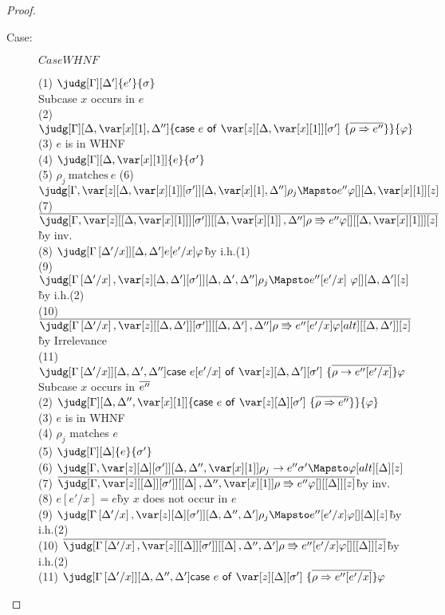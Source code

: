 \begin{proof}
\begin{description}
\item[Case:] $CaseWHNF$
\begin{tabbing}
    (1) $\judg[\G][\D']{e'}{\s}$\\
    Subcase $x$ occurs in $e$\\
    (2) $\judg[\G][\D,\xl,\D'']{\ccase{e}{\z[\D,\xl][\s']~\{\ov{\rho\Rightarrow e''}\}}}{\vp}$\\
    (3) $e$ is in WHNF\\
    (4) $\judg[\G][\D,\xl]{e}{\s'}$\\
    (5) $\rho_j~\textrm{matches}~e$
    (6) $\judg[\G,\zr{\D,\xl}{\s'}][\D,\xl,\D'']{\rho_j \Mapsto  e''}{\vp}[][\D,\xl][z]$\\
    (7) $\ov{\judg[\G,\zr{\irr{\D,\xl}}{\s'}][\irr{\D,\xl},\D'']{\rho\Rrightarrow e''}{\vp}[][\irr{\D,\xl}][z]}$\`by inv.\\
    (8) $\judg[\subst{\G}{\D'}{x}][\D,\D']{e[e'/x]}{\vp}$\`by i.h.(1)\\
    (9) $\judg[\subst{\G}{\D'}{x},\zr{\D,\D'}{\s'}][\D,\D',\D'']{\rho_j \Mapsto e''[e'/x]}{\ \vp}[][\D,\D'][z]$\` by i.h.(2)\\
    (10) $\ov{\judg[\subst{\G}{\D'}{x},\zr{\irr{\D,\D'}}{\s'}][\irr{\D,\D'},\D'']{\rho\Rrightarrow e''[e'/x]}{ \vp}[alt][\irr{\D,\D'}][z]}$ \` by Irrelevance\\
    (11) $\judg[\subst{\G}{\D'}{x}][\D,\D',\D'']{\ccase{e[e'/x]}{\z[\D,\D'][\s']~\{\ov{\rho\to e''[e'/x]}\}}}{\vp}$\\
    Subcase $x$ occurs in $\overline{e''}$\\
    (2) $\judg[\G][\D,\D'',\xl]{\ccase{e}{\z[\D][\s']~\{\ov{\rho\Rightarrow e''}\}}}{\vp}$\\
    (3) $e$ is in WHNF\\
    (4) $\rho_j$ matches $e$\\
    (5) $\judg[\G][\D]{e}{\s'}$\\
    (6) $\judg[\G,\zr{\D}{\s'}][\D,\D'',\xl]{\rho_j \to e''}{\s' \Mapsto \vp}[alt][\D][z]$\\
    (7) $\ov{\judg[\G,\zr{\irr{\D}}{\s'}][\irr{\D},\D'',\xl]{\rho\Rrightarrow e''}{\vp}[][\irr{\D}][z]}$\`by inv.\\
    (8) $e[e'/x] = e$\` by $x$ does not occur in $e$\\
    (9) $\judg[\subst{\G}{\D'}{x},\zr{\D}{\s'}][\D,\D'',\D']{\rho_j \Mapsto e''[e'/x]}{\vp}[][\D][z]$\`by i.h.(2)\\
    (10) $\ov{\judg[\subst{\G}{\D'}{x},\zr{\irr{\D}}{\s'}][\irr{\D},\D'',\D']{\rho\Rrightarrow e''[e'/x]}{ \vp}[][\irr{\D}][z]}$\`by i.h.(2)\\
    (11) $\judg[\subst{\G}{\D'}{x}][\D,\D'',\D']{\ccase{e}{\z[\D][\s']~\{\ov{\rho\Rightarrow e''[e'/x]}\}}}{\vp}$\\
\end{tabbing}


\end{description}
\end{proof}
